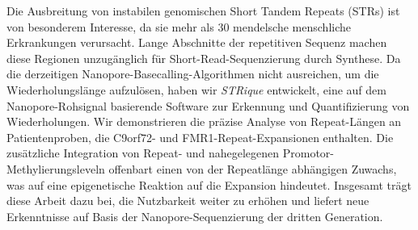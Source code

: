 Die Ausbreitung von instabilen genomischen Short Tandem Repeats (STRs) ist von besonderem Interesse, da sie mehr als 30 mendelsche menschliche Erkrankungen verursacht.
Lange Abschnitte der repetitiven Sequenz machen diese Regionen unzugänglich für Short-Read-Sequenzierung durch Synthese.
Da die derzeitigen Nanopore-Basecalling-Algorithmen nicht ausreichen, um die Wiederholungslänge aufzulösen, haben wir \textit{STRique} entwickelt, eine auf dem Nanopore-Rohsignal basierende Software zur Erkennung und Quantifizierung von Wiederholungen.
Wir demonstrieren die präzise Analyse von Repeat-Längen an Patientenproben, die C9orf72- und FMR1-Repeat-Expansionen enthalten. 
Die zusätzliche Integration von Repeat- und nahegelegenen Promotor-Methylierungsleveln offenbart einen von der Repeatlänge abhängigen Zuwachs, was auf eine epigenetische Reaktion auf die Expansion hindeutet.
Insgesamt trägt diese Arbeit dazu bei, die Nutzbarkeit weiter zu erhöhen und liefert neue Erkenntnisse auf Basis der Nanopore-Sequenzierung der dritten Generation.



